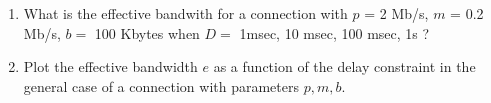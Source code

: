\begin{problem}
\begin{enumerate}
    \item What is the effective bandwith for a connection with $p$ = 2 Mb/s,
    $m$ = 0.2 Mb/s,  $b=$ 100 Kbytes when $D=$ 1msec, 10 msec, 100 msec,
    1s ?
    \item Plot the effective bandwidth $e$ as a function of the delay
    constraint in the general case of a connection with parameters $p,
    m, b$.
\end{enumerate}
\end{problem}
